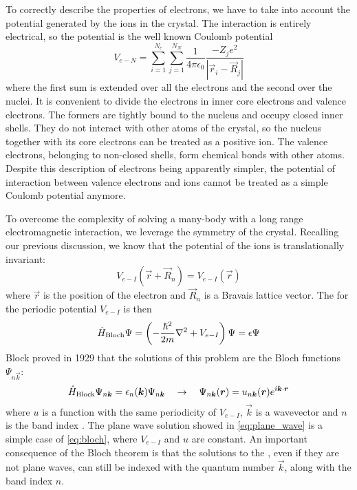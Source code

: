To correctly describe the properties of electrons, we have to take into account the potential generated by the ions in the crystal. The interaction is entirely electrical, so the potential is the well known Coulomb potential
\begin{equation}
    V_{e-N} = \sum_{i=1}^{N_e} \sum_{j=1}^{N_N} \frac{1}{4\pi\epsilon_0} \frac{-Z_je^2}{|\vec{r}_i - \vec{R}_j|}
\end{equation}
where the first sum is extended over all the electrons and the second over the nuclei. It is convenient to divide the electrons in inner core electrons and valence electrons. The formers are tightly bound to the nucleus and occupy closed inner shells. They do not interact with other atoms of the crystal, so the nucleus together with its core electrons can be treated as a positive ion. The valence electrons, belonging to  non-closed shells, form chemical bonds with other atoms. Despite this description of electrons being apparently simpler, the potential of interaction between valence electrons and ions cannot be treated as a simple Coulomb potential anymore.

To overcome the complexity of solving a many-body \sche   with a long range electromagnetic interaction, we leverage the symmetry of the crystal. Recalling our previous discussion, we know that the potential of the ions is translationally invariant:
\begin{equation}
    V_{e-I}(\vec{r}+\vec{R}_n) = V_{e-I}(\vec{r})
\end{equation}
where $\vec{r}$ is the position of the electron and $\vec{R}_n$ is a Bravais lattice vector.
The \sche for the periodic potential $V_{e-I}$ is then
\begin{equation}
    \oper{H}_\text{Bloch} \Psi = \left(-\frac{\hslash^2}{2m} \laplacian + V_{e-I} \right)\Psi = \epsilon\Psi
\end{equation}
Block proved in 1929 that the solutions of this problem are the Bloch functions $\Psi_{n\vec{k}}$:
\begin{equation}
    \label{eq:bloch}
    \hat{H}_\text{Block} \Psi_{n\mathbf{\boldsymbol{k}}} = \epsilon_n(\mathbf{\boldsymbol{k}}) \Psi_{n\mathbf{\boldsymbol{k}}}
    \quad
    \rightarrow
    \quad
    \Psi_{n\mathbf{\boldsymbol{k}}}(\mathbf{\boldsymbol{r}}) = u_{n\mathbf{\boldsymbol{k}}}(\mathbf{\boldsymbol{r}}) e^{i\mathbf{\boldsymbol{k}}\cdot\mathbf{\boldsymbol{r}}}
\end{equation}
where $u$ is a function with the same periodicity of $V_{e-I}$, $\vec{k}$ is a wavevector and $n$ is the band index \cite{bloch1929}. The plane wave solution showed in \cref{eq:plane_wave} is a simple case of \cref{eq:bloch}, where $V_{e-I}$ and $u$ are constant. An important consequence of the Bloch theorem is that the solutions to the \sche, even if they are not plane waves, can still be indexed with the quantum number $\vec{k}$, along with the band index $n$.

